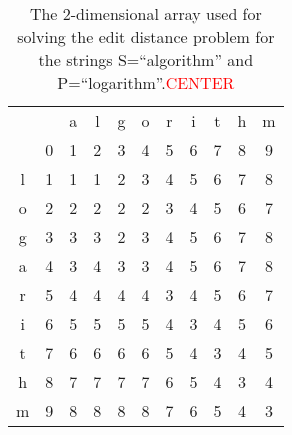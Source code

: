 \documentclass[thesis.tex]{subfiles}
\begin{document}
\begin{table}[!b]
  \centering
    \begin{tabularx}{\textwidth}{ccccccccccc}
      &&a&l&g&o&r&i&t&h&m \\ \cline{2-11}
      &\multicolumn{1}{|c|}{0}&1&\multicolumn{1}{|c|}{2}&3&\multicolumn{1}{|c|}{4}&5&\multicolumn{1}{|c|}{6}&7&\multicolumn{1}{|c|}{8}&\multicolumn{1}{c|}{9}\\ \cline{2-11}
      l &\multicolumn{1}{|c|}{1}&1&\multicolumn{1}{|c|}{1}&2&\multicolumn{1}{|c|}{3}&4&\multicolumn{1}{|c|}{5}&6&\multicolumn{1}{|c|}{7}&\multicolumn{1}{c|}{8}\\ \cline{2-11}
      o &\multicolumn{1}{|c|}{2}&2&\multicolumn{1}{|c|}{2}&2&\multicolumn{1}{|c|}{2}&3&\multicolumn{1}{|c|}{4}&5&\multicolumn{1}{|c|}{6}&\multicolumn{1}{c|}{7}\\ \cline{2-11}
      g &\multicolumn{1}{|c|}{3}&3&\multicolumn{1}{|c|}{3}&2&\multicolumn{1}{|c|}{3}&4&\multicolumn{1}{|c|}{5}&6&\multicolumn{1}{|c|}{7}&\multicolumn{1}{c|}{8}\\ \cline{2-11}
      a &\multicolumn{1}{|c|}{4}&3&\multicolumn{1}{|c|}{4}&3&\multicolumn{1}{|c|}{3}&4&\multicolumn{1}{|c|}{5}&6&\multicolumn{1}{|c|}{7}&\multicolumn{1}{c|}{8}\\ \cline{2-11}
      r &\multicolumn{1}{|c|}{5}&4&\multicolumn{1}{|c|}{4}&4&\multicolumn{1}{|c|}{4}&3&\multicolumn{1}{|c|}{4}&5&\multicolumn{1}{|c|}{6}&\multicolumn{1}{c|}{7}\\ \cline{2-11}
      i &\multicolumn{1}{|c|}{6}&5&\multicolumn{1}{|c|}{5}&5&\multicolumn{1}{|c|}{5}&4&\multicolumn{1}{|c|}{3}&4&\multicolumn{1}{|c|}{5}&\multicolumn{1}{c|}{6}\\ \cline{2-11}
      t &\multicolumn{1}{|c|}{7}&6&\multicolumn{1}{|c|}{6}&6&\multicolumn{1}{|c|}{6}&5&\multicolumn{1}{|c|}{4}&3&\multicolumn{1}{|c|}{4}&\multicolumn{1}{c|}{5}\\ \cline{2-11}
      h &\multicolumn{1}{|c|}{8}&7&\multicolumn{1}{|c|}{7}&7&\multicolumn{1}{|c|}{7}&6&\multicolumn{1}{|c|}{5}&4&\multicolumn{1}{|c|}{3}&\multicolumn{1}{c|}{4}\\ \cline{2-11}
      m &\multicolumn{1}{|c|}{9}&8&\multicolumn{1}{|c|}{8}&8&\multicolumn{1}{|c|}{8}&7&\multicolumn{1}{|c|}{6}&5&\multicolumn{1}{|c|}{4}&\multicolumn{1}{c|}{3}\\ \cline{2-11}
    \end{tabularx}
  \caption[An array used to solve the edit distance problem]{The 2-dimensional array used for solving the edit distance problem for the strings S=``algorithm'' and P=``logarithm''.\textcolor{red}{CENTER}}
  \label{fig:edit_distance_array}
\end{table}
\end{document}
